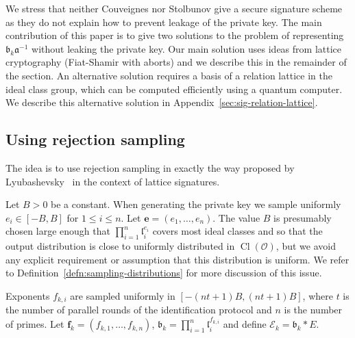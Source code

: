 \documentclass{llncs}
\newcommand{\E}{\mathcal{E}}
\newcommand{\OO}{\mathcal{O}}
\DeclareMathOperator{\Cl}{Cl}
\renewcommand{\a}{\mathfrak{a}}
\renewcommand{\b}{\mathfrak{b}}
\renewcommand{\l}{\mathfrak{l}}
\newcommand{\e}{\mathbf{e}}
\newcommand{\f}{\mathbf{f}}
\begin{document}
We stress that neither Couveignes nor Stolbunov give a secure signature scheme as they do not explain how to prevent leakage of the private key. The main contribution of this paper is to give two solutions to the problem of representing $\b_k \a^{-1}$ without leaking the private key.
Our main solution uses ideas from lattice cryptography (Fiat-Shamir with aborts) and we describe this in the remainder of the section.
An alternative solution requires a basis of a relation lattice in the ideal class group, which can be computed efficiently using a quantum computer. We describe this alternative solution in Appendix~\ref{sec:sig-relation-lattice}.





\subsection{Using rejection sampling}\label{sec:sig-reject-sample}

The idea is to use rejection sampling in exactly the way proposed by Lyubashevsky~\cite{Lyu09} in the context of lattice signatures.

Let $B > 0$ be a constant. When generating the private key we sample uniformly $e_i \in [-B, B]$ for $1 \le i \le n$. Let $\e = ( e_1, \dots, e_n )$.
The value $B$ is presumably chosen large enough that $\prod_{i=1}^n \l_i^{e_i}$ covers most ideal classes and so that the output distribution is close to uniformly distributed in $\Cl(\OO)$, but we avoid any explicit requirement or assumption that this distribution is uniform.
We refer to Definition~\ref{defn:sampling-distributions} for more discussion of this issue.

Exponents $f_{k,i}$ are sampled uniformly in $[-(nt+1)B, (nt+1)B]$, where $t$ is the number of parallel rounds of the identification protocol and $n$ is the number of primes.
Let $\f_k = (f_{k,1}, \dots, f_{k,n} )$, $\b_k = \prod_{i=1}^n \l_i^{f_{k,i}}$ and define $\E_k = \b_k * E $.
\end{document}
